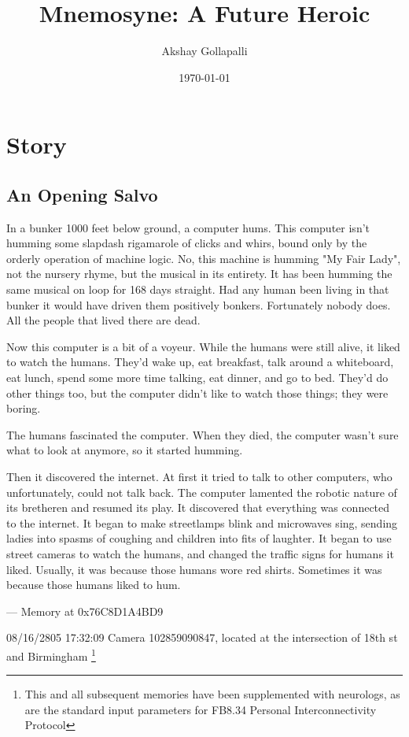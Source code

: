 \documentclass[12pt]{article}
\author{Akshay Gollapalli}
\date{\today}
\title{Mnemosyne: A Future Heroic}
\begin{document}
\maketitle


\section*{Story}
\label{sec:org51d9a75}
\subsection*{An Opening Salvo}
\label{sec:org10ca097}

In a bunker 1000 feet below ground, a computer hums. This computer isn't humming some slapdash rigamarole of clicks and whirs, bound only by the orderly operation of machine logic. No, this machine is humming "My Fair Lady", not the nursery rhyme, but the musical in its entirety. It has been humming the same musical on loop for 168 days straight. Had any human been living in that bunker it would have driven them positively bonkers. Fortunately nobody does. All the people that lived there are dead.

Now this computer is a bit of a voyeur. While the humans were still alive, it liked to watch the humans. They'd wake up, eat breakfast, talk around a whiteboard, eat lunch, spend some more time talking, eat dinner, and go to bed. They'd do other things too, but the computer didn't like to watch those things; they were boring.

The humans fascinated the computer. When they died, the computer wasn't sure what to look at anymore, so it started humming.

Then it discovered the internet. At first it tried to talk to other computers, who unfortunately, could not talk back. The computer lamented the robotic nature of its bretheren and resumed its play. It discovered that everything was connected to the internet. It began to make streetlamps blink and microwaves sing, sending ladies into spasms of coughing and children into fits of laughter. It began to use street cameras to watch the humans, and changed the traffic signs for humans it liked. Usually, it was because those humans wore red shirts. Sometimes it was because those humans liked to hum.

--- Memory at 0x76C8D1A4BD9

08/16/2805 17:32:09 Camera 102859090847, located at the intersection of 18th st and Birmingham \footnote{This and all subsequent memories have been supplemented with neurologs, as are the standard input parameters for FB8.34 Personal Interconnectivity Protocol}
\end{document}

